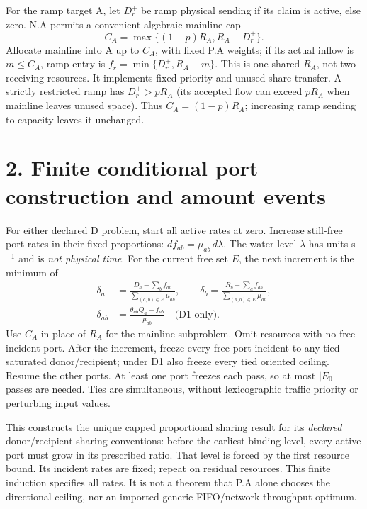 \documentclass[11pt,a4paper]{article}
\begin{document}
For the ramp target A, let $D_r^+$ be ramp physical sending if its claim is
active, else zero. N.A permits a convenient algebraic mainline cap
\begin{equation}
 C_A=\max\{(1-p)R_A,R_A-D_r^+\}.
\end{equation}
Allocate mainline into A up to $C_A$, with fixed P.A weights; if its actual
inflow is $m\le C_A$, ramp entry is $f_r=\min\{D_r^+,R_A-m\}$. This is one
shared $R_A$, not two receiving resources. It implements fixed priority and
unused-share transfer. A strictly restricted ramp has $D_r^+>pR_A$
(its accepted flow can exceed $pR_A$ when mainline leaves unused space).
Thus $C_A=(1-p)R_A$; increasing ramp sending to capacity leaves it unchanged.

\newpage
\section*{2. Finite conditional port construction and amount events}
For either declared D problem, start all active rates at zero. Increase
still-free port rates in their fixed proportions: $df_{ab}=\mu_{ab}\,d\lambda$.
The water level $\lambda$ has units s$^{-1}$ and is \emph{not physical time}.
For the current free set $E$, the next increment is the minimum of
\begin{align}
 \delta_a&=\frac{D_a-\sum_b f_{ab}}{\sum_{(a,b)\in E}\mu_{ab}},\qquad
 \delta_b=\frac{R_b-\sum_a f_{ab}}{\sum_{(a,b)\in E}\mu_{ab}},\\
 \delta_{ab}&=\frac{\theta_{ab}Q_a-f_{ab}}{\mu_{ab}}
 \quad\text{(D1 only)}.
\end{align}
Use $C_A$ in place of $R_A$ for the mainline subproblem. Omit resources with
no free incident port. After the increment, freeze every free port incident
to any tied saturated donor/recipient; under D1 also freeze every tied
oriented ceiling. Resume the other ports. At least one port freezes each
pass, so at most $|E_0|$ passes are needed. Ties are simultaneous, without
lexicographic traffic priority or perturbing input values.

This constructs the unique capped proportional sharing result for its
\emph{declared} donor/recipient sharing conventions: before the earliest
binding level, every active port must grow in its prescribed ratio. That
level is forced by the first resource bound. Its incident rates are fixed;
repeat on residual resources. This finite induction specifies all rates.
It is not a theorem that P.A alone chooses the directional ceiling, nor an
imported generic FIFO/network-throughput optimum.
\end{document}
